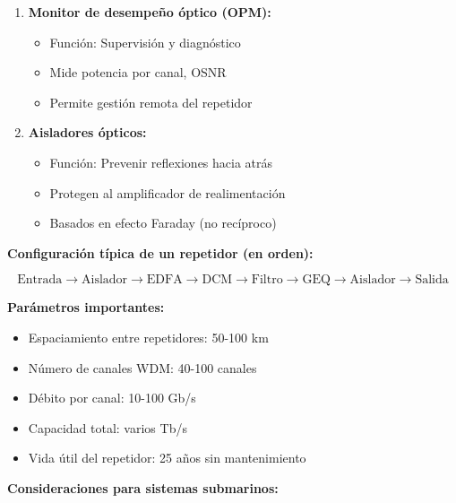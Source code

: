 \documentclass[11pt,a4paper]{article}
\begin{document}
\begin{enumerate}
    \item \textbf{Monitor de desempeño óptico (OPM):}
    \begin{itemize}
        \item Función: Supervisión y diagnóstico
        \item Mide potencia por canal, OSNR
        \item Permite gestión remota del repetidor
    \end{itemize}
    
    \item \textbf{Aisladores ópticos:}
    \begin{itemize}
        \item Función: Prevenir reflexiones hacia atrás
        \item Protegen al amplificador de realimentación
        \item Basados en efecto Faraday (no recíproco)
    \end{itemize}
\end{enumerate}

\textbf{Configuración típica de un repetidor (en orden):}

\begin{equation}
    \text{Entrada} \rightarrow \text{Aislador} \rightarrow \text{EDFA} \rightarrow \text{DCM} \rightarrow \text{Filtro} \rightarrow \text{GEQ} \rightarrow \text{Aislador} \rightarrow \text{Salida}
\end{equation}

\textbf{Parámetros importantes:}

\begin{itemize}
    \item Espaciamiento entre repetidores: 50-100 km
    \item Número de canales WDM: 40-100 canales
    \item Débito por canal: 10-100 Gb/s
    \item Capacidad total: varios Tb/s
    \item Vida útil del repetidor: 25 años sin mantenimiento
\end{itemize}

\textbf{Consideraciones para sistemas submarinos:}
\end{document}
